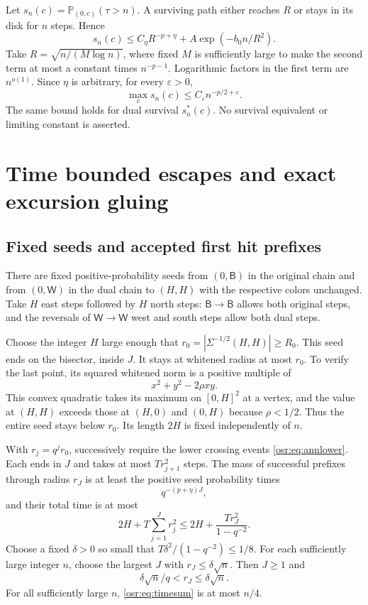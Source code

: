 \documentclass[11pt,letterpaper]{article}
\newcommand{\Prob}{\mathbb P}\newcommand{\E}{\mathbb E}
\newcommand{\B}{\mathsf B}\newcommand{\RR}{\mathsf R}\newcommand{\GG}{\mathsf G}\newcommand{\W}{\mathsf W}
\numberwithin{equation}{section}
\begin{document}
Let $s_n(c)=\Prob_{(0,c)}(\tau>n)$. A surviving path either reaches $R$ or stays in its disk for $n$ steps. Hence
\[
 s_n(c)\le C_\eta R^{-p+\eta}+A\exp(-b_0n/R^2).
\]
Take $R=\sqrt{n/(M\log n)}$, where fixed $M$ is sufficiently large to make the second term at most a constant times $n^{-p-1}$. Logarithmic factors in the first term are $n^{o(1)}$. Since $\eta$ is arbitrary, for every $\varepsilon>0$,
\begin{equation}\label{osr:eq:survival}
 \max_c s_n(c)\le C_\varepsilon n^{-p/2+\varepsilon}.
\end{equation}
The same bound holds for dual survival $s_n^*(c)$. No survival equivalent or limiting constant is asserted.

\section{Time bounded escapes and exact excursion gluing}\label{osr:sec:gluing}
\subsection{Fixed seeds and accepted first hit prefixes}
There are fixed positive-probability seeds from $(0,\B)$ in the original chain and from $(0,\W)$ in the dual chain to $(H,H)$ with the respective colors unchanged. Take $H$ east steps followed by $H$ north steps: $\B\to\B$ allows both original steps, and the reversals of $\W\to\W$ west and south steps allow both dual steps.

Choose the integer $H$ large enough that $r_0=|\Sigma^{-1/2}(H,H)|\ge R_0$. This seed ends on the bisector, inside $J$. It stays at whitened radius at most $r_0$. To verify the last point, its squared whitened norm is a positive multiple of
\[
 x^2+y^2-2\rho xy.
\]
This convex quadratic takes its maximum on $[0,H]^2$ at a vertex, and the value at $(H,H)$ exceeds those at $(H,0)$ and $(0,H)$ because $\rho<1/2$. Thus the entire seed stays below $r_0$. Its length $2H$ is fixed independently of $n$.

With $r_j=q^jr_0$, successively require the lower crossing events \eqref{osr:eq:annlower}. Each ends in $J$ and takes at most $Tr_{j+1}^2$ steps. The mass of successful prefixes through radius $r_J$ is at least the positive seed probability times
\begin{equation}\label{osr:eq:prefixprob}
 q^{-(p+\eta)J},
\end{equation}
and their total time is at most
\begin{equation}\label{osr:eq:timesum}
 2H+T\sum_{j=1}^Jr_j^2
 \le2H+\frac{Tr_J^2}{1-q^{-2}}.
\end{equation}
Choose a fixed $\delta>0$ so small that $T\delta^2/(1-q^{-2})\le1/8$. For each sufficiently large integer $n$, choose the largest $J$ with $r_J\le\delta\sqrt n$. Then $J\ge1$ and
\[
 \delta\sqrt n/q<r_J\le\delta\sqrt n.
\]
For all sufficiently large $n$, \eqref{osr:eq:timesum} is at most $n/4$.
\end{document}
